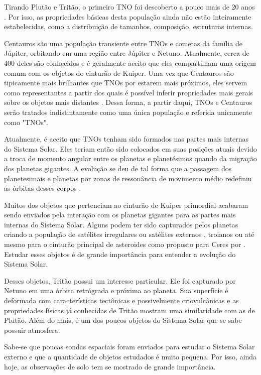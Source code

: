 \documentclass[12pt,a4paper]{monografia}
\begin{document}
Tirando Plutão e Tritão, o primeiro TNO foi descoberto a pouco mais de 20 anos \citep{Jewitt1993}. Por isso, as propriedades básicas desta população ainda não estão inteiramente estabelecidas, como a distribuição de tamanhos, composição, estruturas internas.

Centauros são uma população transiente entre TNOs e cometas da família de Júpiter, orbitando em uma região entre Júpiter e Netuno. Atualmente, cerca de 400 deles são conhecidos e é geralmente aceito que eles compartilham uma origem comum com os objetos do cinturão de Kuiper. Uma vez que Centauros são tipicamente mais brilhantes que TNOs por estarem mais próximos, eles servem como representantes a partir dos quais é possível inferir propriedades mais gerais sobre os objetos mais distantes \citep{Fernandez2002}. Dessa forma, a partir daqui, TNOs e Centauros serão tratados indistintamente como uma única população e referida unicamente como "TNOs".

Atualmente, é aceito que TNOs tenham sido formados nas partes mais internas do Sistema Solar. Eles teriam então sido colocados em suas posições atuais devido a troca de momento angular entre os planetas e planetésimos quando da migração dos planetas gigantes. A evolução se deu de tal forma que a passagem dos planetesimais e planetas por zonas de ressonância de movimento médio redefiniu as órbitas desses corpos \citep{Tsiganis2005}.

Muitos dos objetos que pertenciam ao cinturão de Kuiper primordial acabaram sendo enviados pela interação com os planetas gigantes para as partes mais internas do Sistema Solar. Alguns podem ter sido capturados pelos planetas criando a população de satélites irregulares ou satélites externos \citep{Nesvorny2007}, troianos \citep{Morbidelli2005} ou até mesmo para o cinturão principal de asteroides como proposto para Ceres por \cite{McKinnon2012}. Estudar esses objetos é de grande importância para entender a evolução do Sistema Solar.

Desses objetos, Tritão possui um interesse particular. Ele foi capturado por Netuno \citep{McKinnon2007} em uma órbita retrógrada e próxima ao planeta. Sua superfície é deformada com características tectônicas e possivelmente criovulcânicas \citep{Nimmo2015} e as propriedades físicas já conhecidas de Tritão mostram uma similaridade com as de Plutão. Além do mais, é um dos poucos objetos do Sistema Solar que se sabe possuir atmosfera.

Sabe-se que poucas sondas espaciais foram enviados para estudar o Sistema Solar externo e que a quantidade de objetos estudados é muito pequena. Por isso, ainda hoje, as observações de solo tem se mostrado de grande importância.
\end{document}
